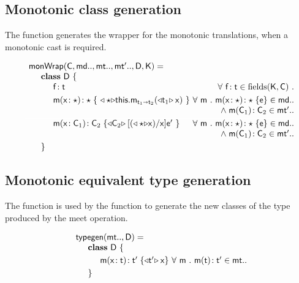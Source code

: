 \documentclass[sigconf]{acmart}
\begin{document}
\subsection{Monotonic class generation}\label{classgen}

The  function generates the wrapper for the monotonic translations,
when a monotonic cast is required.

\footnotesize
\[\begin{array}{l@{~}r@{}r@{~}r@{~}r@{~}rr}
\arrayrulecolor{white}
\classgen{\C, \md.., \mt.., \mtp.., \D, \K}= \\
\SP \class~\D~\{ \\
\SPP \Fdef\f\t & \All {{\f}\!:{\t} \in \text{fields}(\K,\C)}
\\[1mm]\hline
\SPP \Mdef\m\x\any\any {~\MonCast\any{\KCall\this\m{\MonCast{\t[1]}\x}{\t[1]}{\t[2]}}~}
&     \All \m \Mdef\m\x{\any}{\any}\e\in\md.. \\&\wedge\; \Mtype\m{\C_1}{\C_2}\in{\mtp..}
\\[1mm]\hline
\SPP \Mdef\m\x{\C_1}{\C_2} {\MonCast{\C_2}{[{(\MonCast{\any}\x)}/\x]\ep}~}
&     \All \m \Mdef\m\x{\any}{\any}\e\in\md.. \\&\wedge\; \Mtype\m{\C_1}{\C_2}\in\mtp.. 
\\[1mm]\hline
\SP\}
\end{array}
\]
\normalsize



\subsection{Monotonic equivalent type generation}\label{typegen}

The  function is used by the  function to generate the new classes
of the type produced by the meet operation.

\footnotesize
\[\begin{array}{l@{~}r@{}r@{~}r@{~}r@{~}rr}
\arrayrulecolor{white}
\typegen{\mt..}{\D} = \\
\SP \class~\D~\{
\\[1mm]
\SPP \Mdef\m\x\t\tp {{\MonCast\tp{\x}}} 
&
\All m \Mtype\m\t\tp\in\mt..
\\[1mm]
\SP\}
\end{array}
\]
\normalsize



\end{document}
